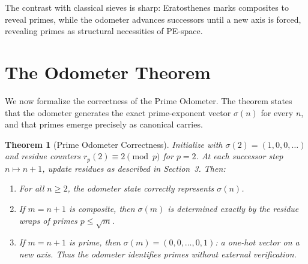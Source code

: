 \documentclass[12pt]{article}
\newtheorem{theorem}{Theorem}[section]
\theoremstyle{definition}
\theoremstyle{remark}
\begin{document}
The contrast with classical sieves is sharp: Eratosthenes marks composites to reveal primes,
while the odometer advances successors until a new axis is forced, revealing primes as structural
necessities of PE-space.

\section{The Odometer Theorem}

We now formalize the correctness of the Prime Odometer. The theorem states that the odometer
generates the exact prime-exponent vector $\sigma(n)$ for every $n$, and that primes emerge
precisely as canonical carries.

\begin{theorem}[Prime Odometer Correctness]
Initialize with $\sigma(2) = (1,0,0,\dots)$ and residue counters
$r_p(2) \equiv 2 \pmod{p}$ for $p=2$. At each successor step $n \mapsto n+1$, update residues
as described in Section~3. Then:
\begin{enumerate}
  \item For all $n \geq 2$, the odometer state correctly represents $\sigma(n)$.
  \item If $m=n+1$ is composite, then $\sigma(m)$ is determined exactly by the residue wraps
        of primes $p \leq \sqrt{m}$.
  \item If $m=n+1$ is prime, then $\sigma(m) = (0,0,\dots,0,1)$: a one-hot vector on a new axis.
        Thus the odometer identifies primes without external verification.
\end{enumerate}
\end{theorem}
\end{document}
